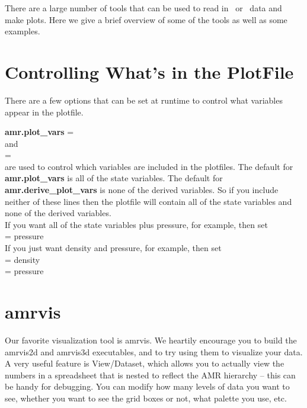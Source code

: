 There are a large number of tools that can be used to read in \iamr\
or \amrex\ data and make plots.  Here we give a brief overview of some
of the tools as well as some examples.

\section{Controlling What's in the PlotFile}

There are a few options that can be set at runtime to control what
variables appear in the plotfile.

{\bf amr.plot\_vars} = \\

\noindent and  \\

 = \\

\noindent are used to control which variables are included in the plotfiles.  The default for {\bf amr.plot\_vars}
is all of the state variables.  The default for {\bf amr.derive\_plot\_vars} is none of
the derived variables.  So if you include neither of these lines then the plotfile
will contain all of the state variables and none of the derived variables. \\

\noindent If you want all of the state variables plus pressure, for example, then set \\

 = pressure \\

\noindent If you just want density and pressure, for example, then set \\

 =  density \\

 = pressure \\



\section{amrvis}
Our favorite visualization tool is amrvis. We heartily encourage you
to build the amrvis2d and amrvis3d executables, and to try using them
to visualize your data. A very useful feature is View/Dataset, which
allows you to actually view the numbers in a spreadsheet that is nested
to reflect the AMR hierarchy -- this can be handy for
debugging. You can modify how many levels of data you want to see,
whether you want to see the grid boxes or not, what palette you use,
etc.

